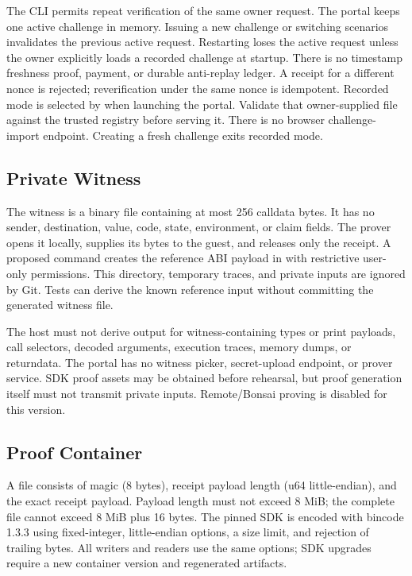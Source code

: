 \documentclass[11pt]{article}
\newcommand{\filepath}[1]{\path{#1}}
\begin{document}
The CLI permits repeat verification of the same owner request. The portal keeps one active challenge in memory. Issuing a new challenge or switching scenarios invalidates the previous active request. Restarting loses the active request unless the owner explicitly loads a recorded challenge at startup. There is no timestamp freshness proof, payment, or durable anti-replay ledger. A receipt for a different nonce is rejected; reverification under the same nonce is idempotent. Recorded mode is selected by  when launching the portal. Validate that owner-supplied file against the trusted registry before serving it. There is no browser challenge-import endpoint. Creating a fresh challenge exits recorded mode.

\subsection{Private Witness}
The witness is a binary file containing at most 256 calldata bytes. It has no sender, destination, value, code, state, environment, or claim fields. The prover opens it locally, supplies its bytes to the guest, and releases only the receipt. A proposed  command creates the reference ABI payload in \filepath{.proofsphere-private/reference.bin} with restrictive user-only permissions. This directory, temporary traces, and private inputs are ignored by Git. Tests can derive the known reference input without committing the generated witness file.

The host must not derive  output for witness-containing types or print payloads, call selectors, decoded arguments, execution traces, memory dumps, or returndata. The portal has no witness picker, secret-upload endpoint, or prover service. SDK proof assets may be obtained before rehearsal, but proof generation itself must not transmit private inputs. Remote/Bonsai proving is disabled for this version.

\subsection{Proof Container}
A  file consists of magic  (8 bytes), receipt payload length (u64 little-endian), and the exact receipt payload. Payload length must not exceed 8 MiB; the complete file cannot exceed 8 MiB plus 16 bytes. The pinned SDK  is encoded with bincode 1.3.3 using fixed-integer, little-endian options, a size limit, and rejection of trailing bytes. All writers and readers use the same options; SDK upgrades require a new container version and regenerated artifacts.
\end{document}
